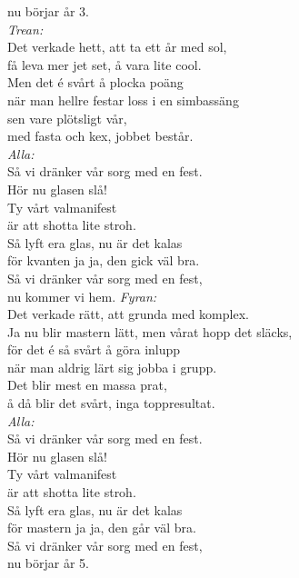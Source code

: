\documentclass[a6paper,10pt]{article}
\begin{document}
\begin{lyrics}
nu börjar år 3.
\vspace{5pt} \\
\textit{Trean:} \\
Det verkade hett, att ta ett år med sol, \\
få leva mer jet set, å vara lite cool. \\
Men det é svårt å plocka poäng \\
när man hellre festar loss i en simbassäng \\
sen vare plötsligt vår, \\
med fasta och kex, jobbet består. 
\vspace{5pt} \\
\textit{Alla:} \\
Så vi dränker vår sorg med en fest. \\
Hör nu glasen slå! \\
Ty vårt valmanifest \\
är att shotta lite stroh. \\
Så lyft era glas, nu är det kalas \\
för kvanten ja ja, den gick väl bra. \\
Så vi dränker vår sorg med en fest, \\
nu kommer vi hem.
\newpage
\setlength{\oddsidemargin}{-0.37in}
\noindent
\textit{Fyran:} \\
Det verkade rätt, att grunda med komplex. \\
Ja nu blir mastern lätt, men vårat hopp det släcks, \\
för det é så svårt å göra inlupp \\
när man aldrig lärt sig jobba i grupp. \\
Det blir mest en massa prat, \\
å då blir det svårt, inga toppresultat. 
\vspace{5pt} \\
\textit{Alla:} \\
Så vi dränker vår sorg med en fest. \\
Hör nu glasen slå! \\
Ty vårt valmanifest \\
är att shotta lite stroh. \\
Så lyft era glas, nu är det kalas \\
för mastern ja ja, den går väl bra. \\
Så vi dränker vår sorg med en fest, \\
nu börjar år 5.
\vspace{5pt} \\

\end{lyrics}
\end{document}

